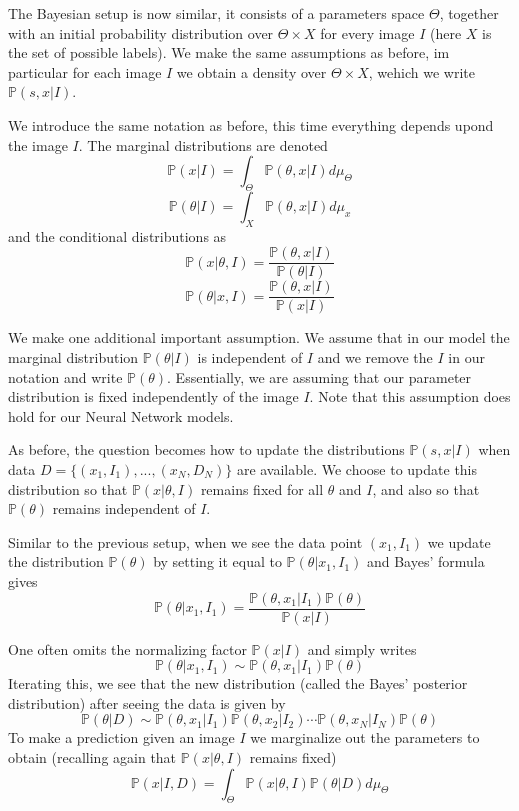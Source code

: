 The Bayesian setup is now similar, it consists of a parameters space $\Theta$, together with an initial probability
distribution over $\Theta\times X$ for every image $I$ (here $X$ is the set of possible labels). We make the same assumptions
as before, im particular for each image $I$ we obtain a density over $\Theta\times X$, wehich we write $\mathbb{P}(s,x|I)$.

We introduce the same notation as before, this time everything depends upond the image $I$. The marginal distributions
are denoted
$$\mathbb{P}(x|I) = \int_{\Theta} \mathbb{P}(\theta,x|I)d\mu_\Theta$$
$$\mathbb{P}(\theta|I) = \int_{X} \mathbb{P}(\theta,x|I)d\mu_x$$
and the conditional distributions as
$$\mathbb{P}(x|\theta,I) = \frac{\mathbb{P}(\theta,x|I)}{\mathbb{P}(\theta|I)}$$
$$\mathbb{P}(\theta|x,I) = \frac{\mathbb{P}(\theta,x|I)}{\mathbb{P}(x|I)}$$

We make one additional important assumption. We assume that in our model the marginal distribution 
$\mathbb{P}(\theta|I)$ is independent of $I$
and we remove the $I$ in our notation and write $\mathbb{P}(\theta)$. Essentially, we are assuming that our
parameter distribution is fixed independently of the image $I$. Note that this assumption does hold for our
Neural Network models.

As before, the question becomes how to update the distributions $\mathbb{P}(s,x|I)$ when data $D = \{(x_1,I_1),...,(x_N,D_N)\}$
are available. We choose to update this distribution so that $\mathbb{P}(x|\theta,I)$ remains fixed for all
$\theta$ and $I$, and also so that $\mathbb{P}(\theta)$ remains independent of $I$.

Similar to the previous setup, when we see the data point $(x_1,I_1)$ we update the distribution $\mathbb{P}(\theta)$
by setting it equal to $\mathbb{P}(\theta|x_1,I_1)$ and Bayes' formula gives
\begin{equation}
 \mathbb{P}(\theta|x_1,I_1) = \frac{\mathbb{P}(\theta,x_1|I_1)\mathbb{P}(\theta)}{\mathbb{P}(x|I)}
\end{equation}

One often omits the normalizing factor $\mathbb{P}(x|I)$ and simply writes 
\begin{equation}
 \mathbb{P}(\theta|x_1,I_1) \sim \mathbb{P}(\theta,x_1|I_1)\mathbb{P}(\theta)
\end{equation}
Iterating this, we see that the new distribution (called the Bayes' posterior distribution) after seeing the data
is given by
\begin{equation}
 \mathbb{P}(\theta|D) \sim \mathbb{P}(\theta,x_1|I_1)\mathbb{P}(\theta,x_2|I_2)\cdots\mathbb{P}(\theta,x_N|I_N)\mathbb{P}(\theta)
\end{equation}
To make a prediction given an image $I$ we marginalize out the parameters to obtain (recalling again that $\mathbb{P}(x|\theta,I)$
remains fixed)
\begin{equation}
 \mathbb{P}(x|I,D) = \int_{\Theta} \mathbb{P}(x|\theta,I)\mathbb{P}(\theta|D)d\mu_{\Theta}
\end{equation}

